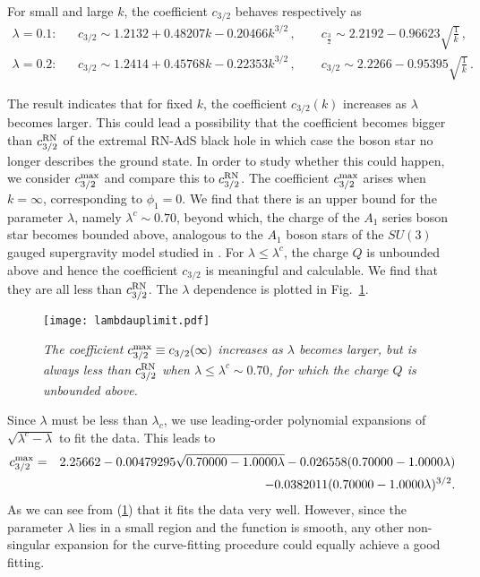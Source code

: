 \documentclass[11pt]{article}
\newcommand{\bea}{\setlength\arraycolsep{2pt} \begin{eqnarray}}
\newcommand{\eea}{\end{eqnarray}}
\newcommand{\nn}{\nonumber}
\def\fft#1#2{{\frac{#1}{#2}}}
\begin{document}
For small and large $k$, the coefficient $c_{3/2}$ behaves respectively as
\bea
\lambda=0.1:&& c_{3/2} \sim 1.2132 + 0.48207 k - 0.20466 k^{3/2} \,,\qquad c_{\fft32}\sim 2.2192-0.96623 \sqrt{\frac{1}{k}}\,,\nn\\
\lambda=0.2:&& c_{3/2} \sim 1.2414 + 0.45768 k - 0.22353 k^{3/2}\,,\qquad c_{3/2}\sim 2.2266-0.95395 \sqrt{\frac{1}{k}} \,.
\eea

The result indicates that for fixed $k$, the coefficient $c_{3/2}(k)$ increases as $\lambda$ becomes larger.  This could lead a possibility that the coefficient becomes bigger than $c_{3/2}^{\rm RN}$ of the extremal RN-AdS black hole in which case the boson star no longer describes the ground state.  In order to study whether this could happen, we consider $c_{3/2}^{\rm max}$ and compare this to $c_{3/2}^{\rm RN}$.  The coefficient $c_{3/2}^{\rm max}$ arises when $k=\infty$, corresponding to $\phi_1=0$. We find that there is an upper bound for the parameter $\lambda$, namely $\lambda^c\sim 0.70$, beyond which, the charge of the $A_1$ series boson star becomes bounded above, analogous to the $A_1$ boson stars of the $SU(3)$ gauged supergravity model studied in \cite{Liu:2020uaz}.  For $\lambda\le \lambda^c$, the charge $Q$ is unbounded above and hence the coefficient $c_{3/2}$ is meaningful and calculable. We find that they are all less than $c_{3/2}^{\rm RN}$.  The $\lambda$ dependence is plotted in Fig.~\ref{lambdauplimit}.

\begin{figure}[htp]
\begin{center}
\texttt{[image: lambdauplimit.pdf]}
\end{center}
\caption{\small\it The coefficient $c_{3/2}^{\rm max}\equiv c_{3/2}(\infty)$ increases as $\lambda$ becomes larger, but is always less than
$c_{3/2}^{\rm RN}$ when $\lambda\le \lambda^c\sim 0.70$, for which the charge $Q$ is unbounded above.}
\label{lambdauplimit}
\end{figure}

Since $\lambda$ must be less than $\lambda_c$, we use leading-order polynomial expansions of $\sqrt{\lambda^c-\lambda}$ to fit the data.  This leads to
\bea
c_{3/2}^{\rm max} &=& 2.25662-0.00479295 \sqrt{0.70000-1.0000 \lambda}-0.026558 (0.70000-1.0000 \lambda)\nn\\
&&-0.0382011 (0.70000-1.0000 \lambda)^{3/2}.
\eea
As we can see from (\ref{lambdauplimit}) that it fits the data very well. However, since the parameter $\lambda$ lies in a small region and the function is smooth, any other non-singular expansion for the curve-fitting procedure could equally achieve a good fitting.
\end{document}
